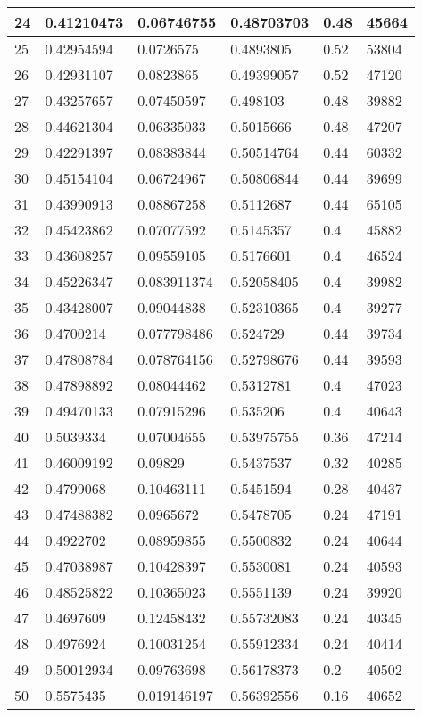 \begin{longtable}{|l|l|l|l|l|l|}
24 & 0.41210473 & 0.06746755 & 0.48703703 & 0.48 & 45664 \\ \hline 
25 & 0.42954594 & 0.0726575 & 0.4893805 & 0.52 & 53804 \\ \hline 
26 & 0.42931107 & 0.0823865 & 0.49399057 & 0.52 & 47120 \\ \hline 
27 & 0.43257657 & 0.07450597 & 0.498103 & 0.48 & 39882 \\ \hline 
28 & 0.44621304 & 0.06335033 & 0.5015666 & 0.48 & 47207 \\ \hline 
29 & 0.42291397 & 0.08383844 & 0.50514764 & 0.44 & 60332 \\ \hline 
30 & 0.45154104 & 0.06724967 & 0.50806844 & 0.44 & 39699 \\ \hline 
31 & 0.43990913 & 0.08867258 & 0.5112687 & 0.44 & 65105 \\ \hline 
32 & 0.45423862 & 0.07077592 & 0.5145357 & 0.4 & 45882 \\ \hline 
33 & 0.43608257 & 0.09559105 & 0.5176601 & 0.4 & 46524 \\ \hline 
34 & 0.45226347 & 0.083911374 & 0.52058405 & 0.4 & 39982 \\ \hline 
35 & 0.43428007 & 0.09044838 & 0.52310365 & 0.4 & 39277 \\ \hline 
36 & 0.4700214 & 0.077798486 & 0.524729 & 0.44 & 39734 \\ \hline 
37 & 0.47808784 & 0.078764156 & 0.52798676 & 0.44 & 39593 \\ \hline 
38 & 0.47898892 & 0.08044462 & 0.5312781 & 0.4 & 47023 \\ \hline 
39 & 0.49470133 & 0.07915296 & 0.535206 & 0.4 & 40643 \\ \hline 
40 & 0.5039334 & 0.07004655 & 0.53975755 & 0.36 & 47214 \\ \hline 
41 & 0.46009192 & 0.09829 & 0.5437537 & 0.32 & 40285 \\ \hline 
42 & 0.4799068 & 0.10463111 & 0.5451594 & 0.28 & 40437 \\ \hline 
43 & 0.47488382 & 0.0965672 & 0.5478705 & 0.24 & 47191 \\ \hline 
44 & 0.4922702 & 0.08959855 & 0.5500832 & 0.24 & 40644 \\ \hline 
45 & 0.47038987 & 0.10428397 & 0.5530081 & 0.24 & 40593 \\ \hline 
46 & 0.48525822 & 0.10365023 & 0.5551139 & 0.24 & 39920 \\ \hline 
47 & 0.4697609 & 0.12458432 & 0.55732083 & 0.24 & 40345 \\ \hline 
48 & 0.4976924 & 0.10031254 & 0.55912334 & 0.24 & 40414 \\ \hline 
49 & 0.50012934 & 0.09763698 & 0.56178373 & 0.2 & 40502 \\ \hline 
50 & 0.5575435 & 0.019146197 & 0.56392556 & 0.16 & 40652 \\ \hline 
\end{longtable}